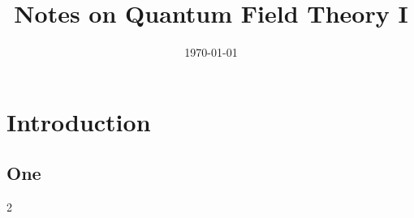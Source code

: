 \documentclass[12pt,aps,
		prd,
        superscriptaddress,
        shortbibliography,
		  nofootinbib,
		floatfix,
		notitlepage, onecolumn
		]{report}
\begin{document}
\newpage
\title{\Huge\textbf{Notes on Quantum Field Theory I}}
\date{\today}
\maketitle
\newpage
\chapter{Introduction}
\section{One}
\begin{multicols}{2}

\end{multicols}
\end{document}
